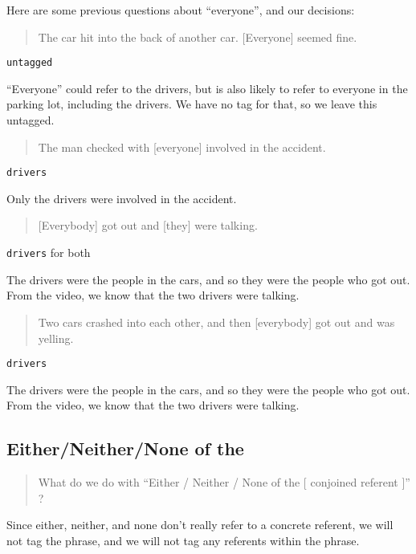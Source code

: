 \documentclass[
]{book}
\begin{document}
Here are some previous questions about ``everyone'', and our decisions:

\begin{quote}
The car hit into the back of another car.
{[}Everyone{]} seemed fine.
\end{quote}

\texttt{untagged}

``Everyone'' could refer to the drivers,
but is also likely to refer to everyone in the parking lot,
including the drivers.
We have no tag for that, so we leave this untagged.

\begin{quote}
The man checked with {[}everyone{]} involved in the accident.
\end{quote}

\texttt{drivers}

Only the drivers were involved in the accident.

\begin{quote}
{[}Everybody{]} got out and {[}they{]} were talking.
\end{quote}

\texttt{drivers} for both

The drivers were the people in the cars,
and so they were the people who got out.
From the video, we know that the two drivers were talking.

\begin{quote}
Two cars crashed into each other,
and then {[}everybody{]} got out and was yelling.
\end{quote}

\texttt{drivers}

The drivers were the people in the cars,
and so they were the people who got out.
From the video, we know that the two drivers were talking.

\hypertarget{eitherneithernone-of-the}{%
\subsection{Either/Neither/None of the}\label{eitherneithernone-of-the}}

\begin{quote}
What do we do with
``Either / Neither / None of the {[} conjoined referent {]}'' ?
\end{quote}

Since either, neither, and none don't really refer to a concrete referent,
we will not tag the phrase,
and we will not tag any referents within the phrase.
\end{document}
